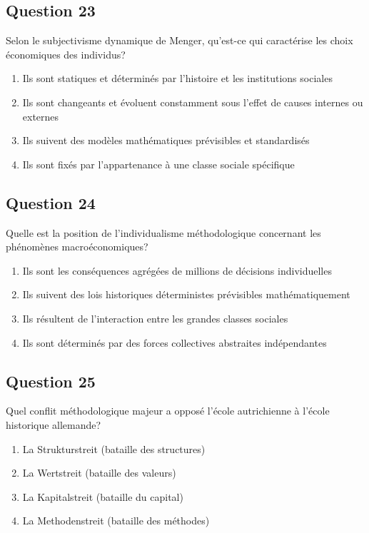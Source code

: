 \documentclass[12pt,a4paper]{article}
\begin{document}
\bigskip


\subsection*{Question 23}
Selon le subjectivisme dynamique de Menger, qu'est-ce qui caractérise les choix économiques des individus?

\begin{enumerate}[label=\Alph*., leftmargin=*]
\item Ils sont statiques et déterminés par l'histoire et les institutions sociales
\item Ils sont changeants et évoluent constamment sous l'effet de causes internes ou externes
\item Ils suivent des modèles mathématiques prévisibles et standardisés
\item Ils sont fixés par l'appartenance à une classe sociale spécifique
\end{enumerate}

\bigskip


\subsection*{Question 24}
Quelle est la position de l'individualisme méthodologique concernant les phénomènes macroéconomiques?

\begin{enumerate}[label=\Alph*., leftmargin=*]
\item Ils sont les conséquences agrégées de millions de décisions individuelles
\item Ils suivent des lois historiques déterministes prévisibles mathématiquement
\item Ils résultent de l'interaction entre les grandes classes sociales
\item Ils sont déterminés par des forces collectives abstraites indépendantes
\end{enumerate}

\bigskip


\subsection*{Question 25}
Quel conflit méthodologique majeur a opposé l'école autrichienne à l'école historique allemande?

\begin{enumerate}[label=\Alph*., leftmargin=*]
\item La Strukturstreit (bataille des structures)
\item La Wertstreit (bataille des valeurs)
\item La Kapitalstreit (bataille du capital)
\item La Methodenstreit (bataille des méthodes)
\end{enumerate}
\end{document}
